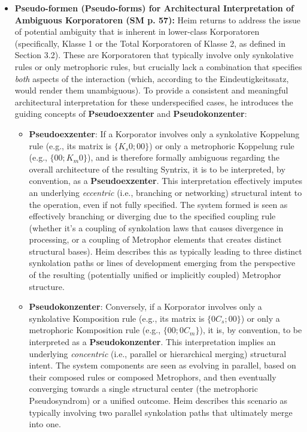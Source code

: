 \documentclass[12pt]{article}
\begin{document}
\begin{itemize}
    \item \textbf{Pseudo-formen (Pseudo-forms) for Architectural Interpretation of Ambiguous Korporatoren (SM p. 57):}
    Heim returns to address the issue of potential ambiguity that is inherent in lower-class Korporatoren (specifically, Klasse 1 or the Total Korporatoren of Klasse 2, as defined in Section 3.2). These are Korporatoren that typically involve only synkolative rules or only metrophoric rules, but crucially lack a combination that specifies \textit{both} aspects of the interaction (which, according to the Eindeutigkeitssatz, would render them unambiguous). To provide a consistent and meaningful architectural interpretation for these underspecified cases, he introduces the guiding concepts of \textbf{Pseudoexzenter} and \textbf{Pseudokonzenter}:
    \begin{itemize}
        \item \textbf{Pseudoexzenter}: If a Korporator involves only a synkolative Koppelung rule (e.g., its matrix is \( \{K_s 0; 0 0\} \)) or only a metrophoric Koppelung rule (e.g., \( \{0 0; K_m 0\} \)), and is therefore formally ambiguous regarding the overall architecture of the resulting Syntrix, it is to be interpreted, by convention, as a \textbf{Pseudoexzenter}. This interpretation effectively imputes an underlying \textit{eccentric} (i.e., branching or networking) structural intent to the operation, even if not fully specified. The system formed is seen as effectively branching or diverging due to the specified coupling rule (whether it's a coupling of synkolation laws that causes divergence in processing, or a coupling of Metrophor elements that creates distinct structural bases). Heim describes this as typically leading to three distinct synkolation paths or lines of development emerging from the perspective of the resulting (potentially unified or implicitly coupled) Metrophor structure.
        \item \textbf{Pseudokonzenter}: Conversely, if a Korporator involves only a synkolative Komposition rule (e.g., its matrix is \( \{0 C_s; 0 0\} \)) or only a metrophoric Komposition rule (e.g., \( \{0 0; 0 C_m\} \)), it is, by convention, to be interpreted as a \textbf{Pseudokonzenter}. This interpretation implies an underlying \textit{concentric} (i.e., parallel or hierarchical merging) structural intent. The system components are seen as evolving in parallel, based on their composed rules or composed Metrophors, and then eventually converging towards a single structural center (the metrophoric Pseudosyndrom) or a unified outcome. Heim describes this scenario as typically involving two parallel synkolation paths that ultimately merge into one.

\end{itemize}
\end{itemize}
\end{document}
